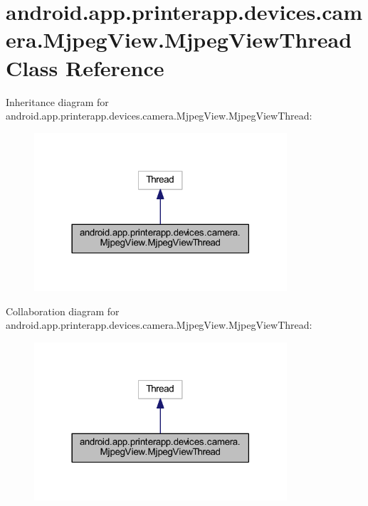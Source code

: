 \hypertarget{classandroid_1_1app_1_1printerapp_1_1devices_1_1camera_1_1_mjpeg_view_1_1_mjpeg_view_thread}{}\section{android.\+app.\+printerapp.\+devices.\+camera.\+Mjpeg\+View.\+Mjpeg\+View\+Thread Class Reference}
\label{classandroid_1_1app_1_1printerapp_1_1devices_1_1camera_1_1_mjpeg_view_1_1_mjpeg_view_thread}


Inheritance diagram for android.\+app.\+printerapp.\+devices.\+camera.\+Mjpeg\+View.\+Mjpeg\+View\+Thread\+:
\nopagebreak
\begin{figure}[H]
\begin{center}
\leavevmode
\includegraphics[width=266pt]{classandroid_1_1app_1_1printerapp_1_1devices_1_1camera_1_1_mjpeg_view_1_1_mjpeg_view_thread__inherit__graph}
\end{center}
\end{figure}


Collaboration diagram for android.\+app.\+printerapp.\+devices.\+camera.\+Mjpeg\+View.\+Mjpeg\+View\+Thread\+:
\nopagebreak
\begin{figure}[H]
\begin{center}
\leavevmode
\includegraphics[width=266pt]{classandroid_1_1app_1_1printerapp_1_1devices_1_1camera_1_1_mjpeg_view_1_1_mjpeg_view_thread__coll__graph}
\end{center}
\end{figure}
